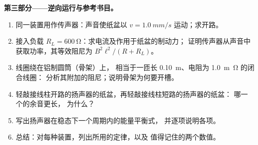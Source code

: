 \begin{problem}
\medskip
\noindent\textbf{第三部分——逆向运行与参考书目。}
\begin{enumerate}[resume]
  \item 同一装置用作传声器：声音使纸盆以
        $v = \qty{1.0}{mm/s}$ 运动；求开路。
  \item 接入负载 $R_L = \qty{600}{\ohm}$：求电流及作用于纸盆的制动力；
        证明传声器从声音中获取功率，其等效阻尼为
        $B^2\ell^2/(R + R_L)$。
  \item 线圈绕在铝制圆筒（骨架）上，
        相当于一匝长 \qty{0.10}{m}、电阻为 \qty{1.0}{m\ohm} 的闭合线圈：
        分析其附加的阻尼；说明骨架为何要开槽。
  \item 轻敲接线柱开路的扬声器的纸盆，再轻敲接线柱短路的扬声器的纸盆：
        哪一个的余音更长，
        为什么？
  \item 写出扬声器在稳态下一个周期内的能量平衡式，
        并逐项说明各项。
  \item 总结：对每种装置，列出所用的定律，以及
        值得记住的两个数值。
\end{enumerate}
\end{problem}
